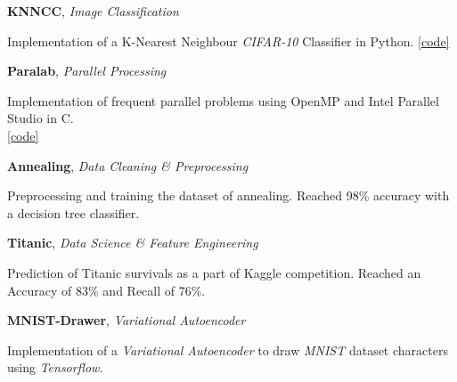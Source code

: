 \documentclass[margin, 10pt]{res} %
\begin{document}
	\textbf{KNNCC}, 
	\textit{Image Classification}
	\begin{innerlist}
		\item Implementation of a K-Nearest Neighbour \textit{CIFAR-10} Classifier in Python.
		\hfill{\UrlFont\href{https://github.com/aligholamee/KNNCC}{[code]}}
	\end{innerlist}

\textbf{Paralab}, 
\textit{Parallel Processing}
\begin{innerlist}
	\item Implementation of frequent parallel problems using OpenMP and Intel Parallel Studio in C.\\ \phantom{km}
	\hfill{\UrlFont\href{https://github.com/aligholamee/ParaLab/tree/master}{[code]}}
\end{innerlist}

\textbf{Annealing}, 
\textit{Data Cleaning \& Preprocessing}
\begin{innerlist}
	\item Preprocessing and training the dataset of annealing. Reached 98\% accuracy with a decision tree classifier.\\ \phantom{km}
	\hfill{}
\end{innerlist}

\textbf{Titanic}, 
\textit{Data Science \& Feature Engineering}
\begin{innerlist}
	\item Prediction of Titanic survivals as a part of Kaggle competition. Reached an\\ Accuracy of 83\% and Recall of 76\%. \href{https://github.com/aligholamee/Titanic}{\hfill{\UrlFont[code]}}
\end{innerlist}

\textbf{MNIST-Drawer}, 
\textit{Variational Autoencoder}
\begin{innerlist}
	\item Implementation of a \textit{Variational Autoencoder} to draw \textit{MNIST} dataset characters\\ using \textit{Tensorflow}. \href{https://github.com/aligholamee/MNIST-Drawer}{\hfill{\UrlFont[code]}}
\end{innerlist}
\end{document}
